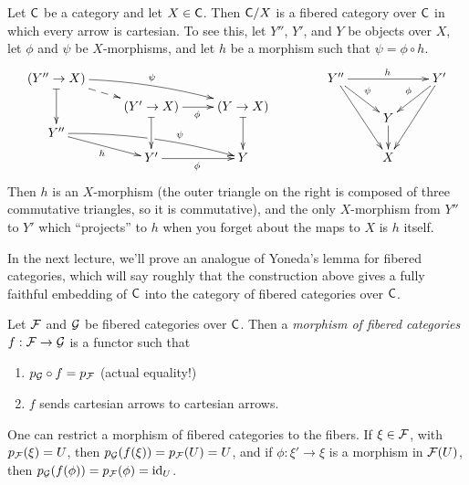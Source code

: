  \begin{example}\label{lec21Eg:representable_fibered_categories}
   Let $\text{\sf C}$ be a category and let $X\in \text{\sf C}$. Then $\text{\sf C}/X$ is a fibered category over $\text{\sf C}$
   in which every arrow is cartesian. To see this, let $Y''$, $Y'$, and $Y$ be objects
   over $X$, let $\phi$ and $\psi$ be $X$-morphisms, and let $h$ be a morphism such that
   $\psi=\phi\circ h$.
   \[\xymatrix@R-1.5pc{
    (Y''\to X) \ar@{|->}[dd]\ar@{-->}[dr] \ar@/^/[rrd]^{\psi}\\
     & (Y'\to X)\ar@{|->}[dd] \ar[r]_\phi & (Y\to X) \ar@{|->}[dd]\\
    Y'' \ar[dr]_{h} \ar@/^/[rrd]^(.65){\psi}|!{[ru];[rd]}\hole \\
    & Y' \ar[r]_{\phi} & Y
   }\qquad\qquad
   \xymatrix@R-.5pc{
    Y'' \ar[rr]^h \ar[dr]^\psi \ar[ddr] & & Y'\ar[dl]_\phi \ar[ddl]\\
    & Y\ar[d]\\ & X
   }\]
    Then $h$ is an $X$-morphism (the outer triangle on the right is composed of three
   commutative triangles, so it is commutative), and the only $X$-morphism from $Y''$ to
   $Y'$ which ``projects'' to $h$ when you forget about the maps to $X$ is $h$ itself.
 \end{example}
 In the next lecture, we'll prove an analogue of Yoneda's lemma for fibered categories,
 which will say roughly that the construction above gives a fully faithful embedding of
 $\text{\sf C}$ into the category of fibered categories over $\text{\sf C}$.
 \begin{definition}
   Let $\mathcal{F}$ and $\mathcal{G}$ be fibered categories over $\text{\sf C}$. Then a \emph{morphism of fibered
   categories} $f:\mathcal{F}\to \mathcal{G}$ is a functor such that
   \begin{enumerate}
     \item $p_{\mathcal{G}}\circ f=p_{\mathcal{F}}$ (actual equality!)
     \item $f$ sends cartesian arrows to cartesian arrows. \qedhere
   \end{enumerate}
 \end{definition}
 \begin{remark}
   One can restrict a morphism of fibered categories to the fibers. If $\xi\in \mathcal{F}$, with
   $p_{\mathcal{F}}(\xi)=U$, then $p_{\mathcal{G}}(f(\xi))=p_{\mathcal{F}}(U)=U$, and if $\phi:\xi'\to \xi$ is a morphism in
   $\mathcal{F}(U)$, then $p_{\mathcal{G}}(f(\phi))=p_{\mathcal{F}}(\phi)=\operatorname{id}_U$.
 \end{remark}
